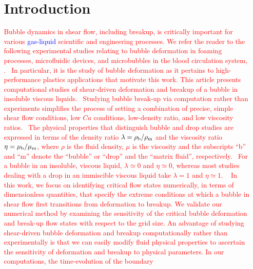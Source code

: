 \documentclass{elsarticle}
\begin{document}
\section{Introduction}

%
%
\textcolor{red}
{
Bubble dynamics in shear flow, including breakup, is critically important for various \textcolor{blue} {gas-liquid} scientific and engineering processes. 
We refer the reader to the following experimental studies relating to bubble deformation in foaming processes, microfluidic devices, 
and microbubbles in the blood circulation system, \cite{ChuFinBouAtaHamPug19,MulTobDreFisWin08,BenRodFauPinFerPerGarMirLim18,DreSai15}.  
In particular, it is the study of bubble deformation as it pertains to high-performance plastics applications that motivate this work.
This article presents computational studies of shear-driven deformation and breakup of a bubble in insoluble viscous liquids.  
Studying bubble break-up via computation rather than experiments simplifies the process of setting a combination of precise, simple shear 
flow conditions, low $Ca$ conditions, low-density ratio, and low viscosity ratios.  The physical properties that distinguish 
bubble and drop studies are expressed in terms of the density ratio $\lambda = \rho_{\rm b} / \rho_{\rm m}$ and the viscosity 
ratio $\eta = \mu_{\rm b} / \mu_{\rm m}$, where $\rho$ is the fluid density, $\mu$ is the viscosity and the subscripts ``b'' and ``m'' 
denote the ``bubble'' or ``drop'' and the ``matrix fluid'', respectively.  For a bubble in an insoluble, viscous liquid, $\lambda \simeq 0$ 
and $\eta \simeq 0$, whereas most studies dealing with a drop in an immiscible viscous liquid take $\lambda =1$ and $\eta \simeq 1$.  
%
In this work, we focus on identifying critical flow states numerically, in terms of dimensionless quantities, that specify the extreme 
conditions at which a bubble in shear flow first transitions from deformation to breakup.  We validate our numerical method by examining 
the sensitivity of the critical bubble deformation and break-up flow states with respect to the grid size.  An advantage of studying shear-driven 
bubble deformation and breakup computationally rather than experimentally is that we can easily modify fluid physical properties to 
ascertain the sensitivity of deformation and breakup to physical parameters.  In our computations, the time-evolution of the boundary 
}
\end{document}
